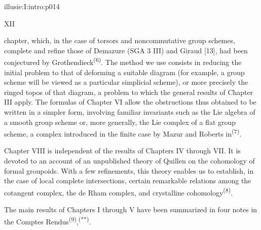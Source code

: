 \IllusieSetPhysicalPageSize{447bp}{698.6bp}
\begin{illusiefrontpage}{illusie:I:intro:p014}{}
\begin{center}\fontsize{10}{12}\selectfont XII\end{center}
\vspace{12bp}
\hypertarget{illusie:I:intro:p014:p1}{}%
chapter, which, in the case of torsors and noncommutative group schemes, complete
and refine those of Demazure (SGA 3 III) and Giraud [13], had been conjectured by
Grothendieck\textsuperscript{(6)}. The method we use consists in reducing the
initial problem to that of deforming a suitable diagram (for example, a group
scheme will be viewed as a particular simplicial scheme), or more precisely the
ringed topos of that diagram, a problem to which the general results of Chapter III
apply. The formulas of Chapter VI allow the obstructions thus obtained to be
written in a simpler form, involving familiar invariants such as the Lie algebra
of a smooth group scheme or, more generally, the Lie complex of a flat group
scheme, a complex introduced in the finite case by Mazur and Roberts
in\textsuperscript{(7)}.

\vspace{4bp}
\hypertarget{illusie:I:intro:p014:p2}{}%
Chapter VIII is independent of the results of Chapters IV through VII. It is
devoted to an account of an unpublished theory of Quillen on the cohomology of
formal groupoids. With a few refinements, this theory enables us to establish, in
the case of local complete intersections, certain remarkable relations among the
cotangent complex, the de Rham complex, and crystalline
cohomology\textsuperscript{(8)}.

\vspace{4bp}
\hypertarget{illusie:I:intro:p014:p3}{}%
The main results of Chapters I through V have been summarized in four notes in the
Comptes Rendus\textsuperscript{(9)},\textsuperscript{(**)}.

\IllusieNoteRule
{}\hypertarget{illusie:I:intro:p014:n6}{}%
\hypertarget{illusie:I:intro:p014:n7}{}%
\hypertarget{illusie:I:intro:p014:n8}{}%
\hypertarget{illusie:I:intro:p014:n9}{}%
\hypertarget{illusie:I:intro:p014:nss}{}%
\end{illusiefrontpage}
